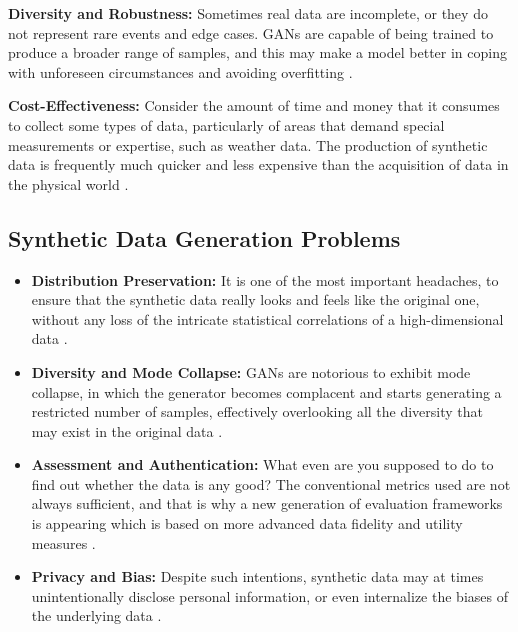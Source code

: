 \documentclass[12pt, draftclsnofoot, onecolumn]{IEEEtran}
\begin{document}
\textbf{Diversity and Robustness:} Sometimes real data are incomplete, or they do not represent rare events and edge cases. GANs are capable of being trained to produce a broader range of samples, and this may make a model better in coping with unforeseen circumstances and avoiding overfitting \cite{ref5,ref17,ref6}.

\textbf{Cost-Effectiveness:} Consider the amount of time and money that it consumes to collect some types of data, particularly of areas that demand special measurements or expertise, such as weather data. The production of synthetic data is frequently much quicker and less expensive than the acquisition of data in the physical world \cite{ref9,ref20,ref21}.

\subsection{Synthetic Data Generation Problems}
\begin{itemize}
    \item \textbf{Distribution Preservation:} It is one of the most important headaches, to ensure that the synthetic data really looks and feels like the original one, without any loss of the intricate statistical correlations of a high-dimensional data \cite{ref6,ref24}.
    \item \textbf{Diversity and Mode Collapse:} GANs are notorious to exhibit mode collapse, in which the generator becomes complacent and starts generating a restricted number of samples, effectively overlooking all the diversity that may exist in the original data \cite{ref15,ref16}.
    \item \textbf{Assessment and Authentication:} What even are you supposed to do to find out whether the data is any good? The conventional metrics used are not always sufficient, and that is why a new generation of evaluation frameworks is appearing which is based on more advanced data fidelity and utility measures \cite{ref1,ref17}.
    \item \textbf{Privacy and Bias:} Despite such intentions, synthetic data may at times unintentionally disclose personal information, or even internalize the biases of the underlying data \cite{ref3,ref18,ref13}.
\end{itemize}
\end{document}
